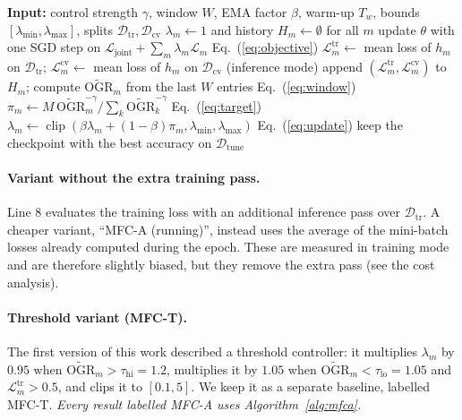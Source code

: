 \documentclass[fleqn,10pt]{wlscirep}
\newcommand{\Ltr}{\mathcal{L}^{\mathrm{tr}}}
\newcommand{\Lcv}{\mathcal{L}^{\mathrm{cv}}}
\newcommand{\OGR}{\mathrm{OGR}}
\begin{document}
\begin{algorithm}[t]
\caption{MFC-A (the method evaluated in all main experiments)}
\label{alg:mfca}
\begin{algorithmic}[1]
\STATE \textbf{Input:} control strength $\gamma$, window $W$, EMA factor $\beta$, warm-up $T_w$, bounds $[\lambda_{\min},\lambda_{\max}]$, splits $\mathcal{D}_{\mathrm{tr}},\mathcal{D}_{\mathrm{cv}}$
\STATE $\lambda_m\leftarrow1$ and history $H_m\leftarrow\emptyset$ for all $m$
    \STATE update $\theta$ with one SGD step on $\mathcal{L}_{\mathrm{joint}}+\sum_m\lambda_m\mathcal{L}_m$ \hfill Eq.~(\ref{eq:objective})
  \ENDFOR
    \STATE $\Ltr_m\leftarrow$ mean loss of $h_m$ on $\mathcal{D}_{\mathrm{tr}}$; \; $\Lcv_m\leftarrow$ mean loss of $h_m$ on $\mathcal{D}_{\mathrm{cv}}$ \hfill (inference mode)
    \STATE append $(\Ltr_m,\Lcv_m)$ to $H_m$; \; compute $\widetilde{\OGR}_m$ from the last $W$ entries \hfill Eq.~(\ref{eq:window})
  \ENDFOR
      \STATE $\pi_m\leftarrow M\,\widetilde{\OGR}_m^{-\gamma}/\sum_k\widetilde{\OGR}_k^{-\gamma}$ \hfill Eq.~(\ref{eq:target})
      \STATE $\lambda_m\leftarrow\operatorname{clip}(\beta\lambda_m+(1-\beta)\pi_m,\lambda_{\min},\lambda_{\max})$ \hfill Eq.~(\ref{eq:update})
    \ENDFOR
  \ENDIF
  \STATE keep the checkpoint with the best accuracy on $\mathcal{D}_{\mathrm{tune}}$
\ENDFOR
\end{algorithmic}
\end{algorithm}

\paragraph{Variant without the extra training pass.} Line 8 evaluates the training loss with an additional inference pass over $\mathcal{D}_{\mathrm{tr}}$. A cheaper variant, ``MFC-A (running)'', instead uses the average of the mini-batch losses already computed during the epoch. These are measured in training mode and are therefore slightly biased, but they remove the extra pass (see the cost analysis).

\paragraph{Threshold variant (MFC-T).} The first version of this work described a threshold controller: it multiplies $\lambda_m$ by $0.95$ when $\widetilde{\OGR}_m>\tau_{\mathrm{hi}}{=}1.2$, multiplies it by $1.05$ when $\widetilde{\OGR}_m<\tau_{\mathrm{lo}}{=}1.05$ and $\Ltr_m>0.5$, and clips it to $[0.1,5]$. We keep it as a separate baseline, labelled MFC-T. \emph{Every result labelled MFC-A uses Algorithm~\ref{alg:mfca}.}
\end{document}
